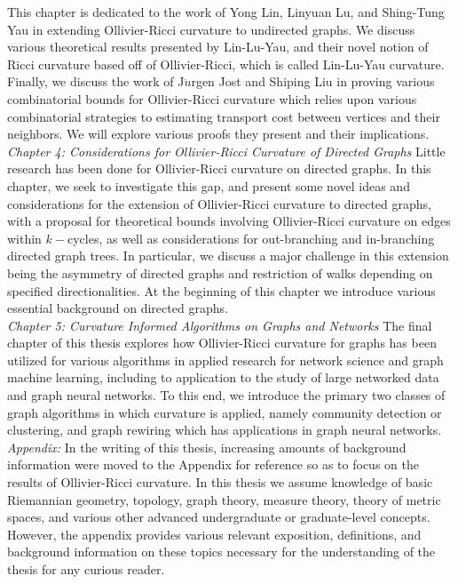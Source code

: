 \documentclass{Dissertate}
\theoremstyle{definition}
\theoremstyle{definition} %
\theoremstyle{definition}
\begin{document}
This chapter is dedicated to the work of Yong Lin, Linyuan Lu, and Shing-Tung Yau in extending Ollivier-Ricci curvature to undirected graphs. We discuss various theoretical results presented by Lin-Lu-Yau, and their novel notion of Ricci curvature based off of Ollivier-Ricci, which is called Lin-Lu-Yau curvature. Finally, we discuss the work of J$\ddot{u}$rgen Jost and Shiping Liu in proving various combinatorial bounds for Ollivier-Ricci curvature which relies upon various combinatorial strategies to estimating transport cost between vertices and their neighbors. We will explore various proofs they present and their implications.\\
\vspace{0.5cm}
\noindent
\textit{Chapter 4: Considerations for Ollivier-Ricci Curvature of Directed Graphs}
Little research has been done for Ollivier-Ricci curvature on directed graphs. In this chapter, we seek to investigate this gap, and present some novel ideas and considerations for the extension of Ollivier-Ricci curvature to directed graphs, with a proposal for theoretical bounds involving Ollivier-Ricci curvature on edges within $k-$cycles, as well as considerations for out-branching and in-branching directed graph trees. In particular, we discuss a major challenge in this extension being the asymmetry of directed graphs and restriction of walks depending on specified directionalities. At the beginning of this chapter we introduce various essential background on directed graphs. \\
\vspace{0.5cm}
\noindent
\textit{Chapter 5: Curvature Informed Algorithms on Graphs and Networks}
The final chapter of this thesis explores how Ollivier-Ricci curvature for graphs has been utilized for various algorithms in applied research for network science and graph machine learning, including to application to the study of large networked data and graph neural networks. To this end, we introduce the primary two classes of graph algorithms in which curvature is applied, namely community detection or clustering, and graph rewiring which has applications in graph neural networks. \\
\vspace{0.5cm}
\textit{Appendix:} In the writing of this thesis, increasing amounts of background information were moved to the Appendix for reference so as to focus on the results of Ollivier-Ricci curvature. In this thesis we assume knowledge of basic Riemannian geometry, topology, graph theory, measure theory, theory of metric spaces, and various other advanced undergraduate or graduate-level concepts. However, the appendix provides various relevant exposition, definitions, and background information on these topics necessary for the understanding of the thesis for any curious reader. 
\end{document}
